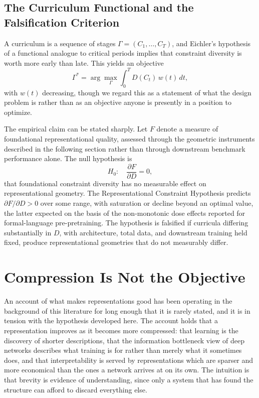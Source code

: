 \documentclass[11pt]{article}
\begin{document}
\subsection{The Curriculum Functional and the Falsification Criterion}

A curriculum is a sequence of stages $\Gamma=(C_1,\ldots,C_T)$, and Eichler's hypothesis of a functional analogue to critical periods implies that constraint diversity is worth more early than late. This yields an objective
\[
\Gamma^{*}=\arg\max_{\Gamma}\int_{0}^{T} D(C_t)\,w(t)\,dt,
\]
with $w(t)$ decreasing, though we regard this as a statement of what the design problem is rather than as an objective anyone is presently in a position to optimize.

The empirical claim can be stated sharply. Let $F$ denote a measure of foundational representational quality, assessed through the geometric instruments described in the following section rather than through downstream benchmark performance alone. The null hypothesis is
\[
H_0:\quad \frac{\partial F}{\partial D}=0,
\]
that foundational constraint diversity has no measurable effect on representational geometry. The Representational Constraint Hypothesis predicts $\partial F/\partial D>0$ over some range, with saturation or decline beyond an optimal value, the latter expected on the basis of the non-monotonic dose effects reported for formal-language pre-pretraining. The hypothesis is falsified if curricula differing substantially in $D$, with architecture, total data, and downstream training held fixed, produce representational geometries that do not measurably differ.


\section{Compression Is Not the Objective}
\label{sec:compression}

An account of what makes representations good has been operating in the background of this literature for long enough that it is rarely stated, and it is in tension with the hypothesis developed here. The account holds that a representation improves as it becomes more compressed: that learning is the discovery of shorter descriptions, that the information bottleneck view of deep networks describes what training is for rather than merely what it sometimes does, and that interpretability is served by representations which are sparser and more economical than the ones a network arrives at on its own. The intuition is that brevity is evidence of understanding, since only a system that has found the structure can afford to discard everything else.
\end{document}
